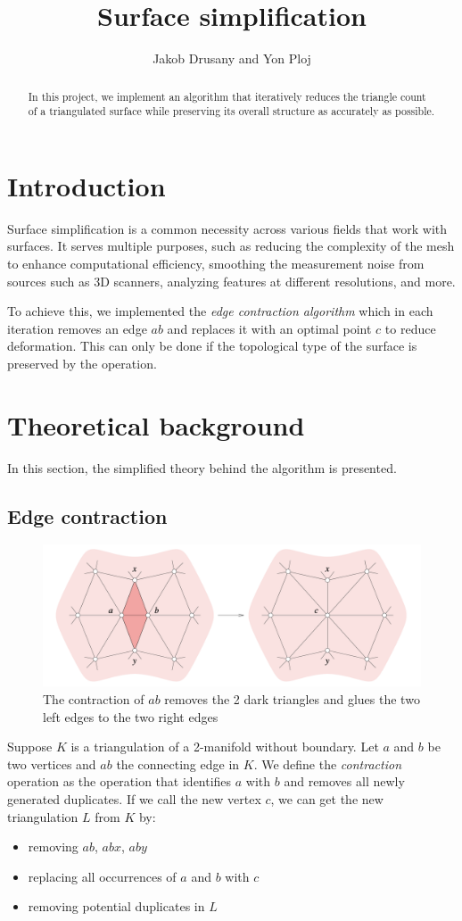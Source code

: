 \documentclass{ijclclp}
\title{Surface simplification}
\author{Jakob Drusany and Yon Ploj}
\begin{document}
\maketitle
\begin{abstract}
In this project, we implement an algorithm that iteratively reduces the triangle count of a triangulated surface while preserving its overall structure as accurately as possible.
\end{abstract}

\section{Introduction}
Surface simplification is a common necessity across various fields that work with surfaces. It serves multiple purposes, such as reducing the complexity of the mesh to enhance computational efficiency, smoothing the measurement noise from sources such as 3D scanners, analyzing features at different resolutions, and more.

To achieve this, we implemented the \textit{edge contraction algorithm}
which in each iteration removes an edge $ab$ and replaces it with an optimal point $c$ to reduce deformation. This can only be done if the topological type of the surface is preserved by the operation.
\section{Theoretical background}
In this section, the simplified theory behind the algorithm is presented.
\subsection{Edge contraction}
\begin{figure}[h]
    \centering
    \includegraphics[width=0.8\linewidth]{contraction.png}
    \caption{The contraction of $ab$ removes the 2 dark triangles and glues the two left edges to the two right edges}
    \label{fig:contraction}
\end{figure}
Suppose $K$ is a triangulation of a 2-manifold without boundary. Let $a$ and $b$ be two vertices and $ab$ the connecting edge in $K$. We define the \textit{contraction} operation as the operation that identifies $a$ with $b$ and removes all newly generated duplicates. If we call the new vertex $c$, we can get the new triangulation $L$ from $K$ by:
\begin{itemize}
    \item removing $ab$, $abx$, $aby$
    \item replacing all occurrences of $a$ and $b$ with $c$
    \item removing potential duplicates in $L$
\end{itemize}
\end{document}
